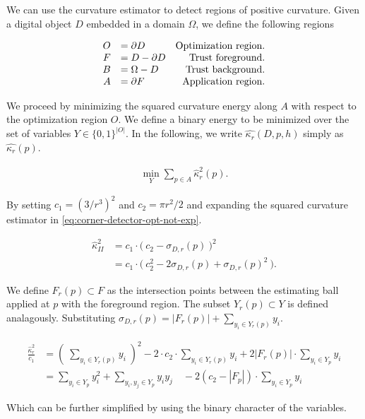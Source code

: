 \documentclass[runningheads]{llncs}
\begin{document}
We can use the curvature estimator to detect regions of positive curvature. Given a digital object $D$ embedded in a domain $\Omega$, we define the following regions

\[\arraycolsep=5pt
\begin{array}{rlr}
	O &= \partial D & \text{Optimization region.} \\
	F &= D - \partial D & \text{Trust foreground.} \\
	B &= \Omega - D & \text{Trust background.} \\
	A &= \partial F & \text{Application region}.
\end{array}
\]

We proceed by minimizing the squared curvature energy along $A$ with respect to the optimization region $O$. We define a binary energy to be minimized over the set of variables $Y \in \{0,1\}^{|O|}$. In the following, we write $\hat{\kappa_r}(D,p,h)$ simply as $\hat{\kappa_r}(p)$.

\begin{align}			
	\min_{Y} \sum_{p \in A}{\hat{\kappa}_{r}^2(p)}.
	\label{eq:corner-detector-opt-not-exp}
\end{align}

By setting $c_1 = (3/r^3)^2$ and $c_2=\pi r^2/2$ and expanding the squared curvature estimator in \eqref{eq:corner-detector-opt-not-exp}.

\begin{align*}
\hat{\kappa}_{II}^2 &= c_1 \cdot \big(\: c_2 - \sigma_{D,r}(p) \: \big)^2 \\
&= c_1 \cdot \big(\: c_2^2 - 2\sigma_{D,r}(p) + \sigma_{D,r}(p)^2 \: \big).
\end{align*}

We define $F_r(p) \subset F$ as the intersection points between the estimating ball applied at $p$ with the foreground region. The subset $Y_r(p) \subset Y$ is defined  analagously. Substituting $\sigma_{D,r}(p) = |F_r(p)| + \sum_{y_i \in Y_r(p)}{y_i}$.

	\begin{align*}
		\frac{\hat{\kappa}_{r}^2}{c_1} &= \left( \; \sum_{y_i \in Y_r(p)}{y_i} \; \right) ^2 -2 \cdot c_2\cdot \sum_{y_i \in Y_r(p)}{y_i} + 2 |F_r(p)| \cdot \sum_{ y_i \in Y_{p} }{y_i} \\[1em]
		&= \sum_{y_i \in Y_{p}}{y_i^2} + \sum_{ y_i,y_j \in Y_{p} }{y_iy_j} \quad - 2 (c_2-|F_p|)\cdot \sum_{y_i \in Y_{p}}{y_i}
	\end{align*}
	
	Which can be further simplified by using the binary character of the variables.
	
\end{document}
